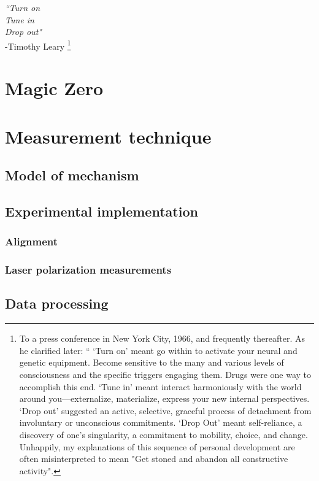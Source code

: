 
\begin{adjustwidth}{3cm}{0cm}
\begin{flushright}
{\emph{``Turn on\\
		Tune in\\
		Drop out"\\} 
-Timothy Leary \footnote{To a press conference in New York City, 1966, and frequently thereafter. As he clarified later: `` `Turn on' meant go within to activate your neural and genetic equipment. Become sensitive to the many and various levels of consciousness and the specific triggers engaging them. Drugs were one way to accomplish this end. `Tune in' meant interact harmoniously with the world around you—externalize, materialize, express your new internal perspectives. `Drop out' suggested an active, selective, graceful process of detachment from involuntary or unconscious commitments. `Drop Out' meant self-reliance, a discovery of one's singularity, a commitment to mobility, choice, and change. Unhappily, my explanations of this sequence of personal development are often misinterpreted to mean "Get stoned and abandon all constructive activity".}}
\end{flushright}
\end{adjustwidth}

\section{Magic Zero}\label{sec:to-history}
\section{Measurement technique}\label{sec:to-method}
\subsection{Model of mechanism}\label{ssec:to-model}
\subsection{Experimental implementation}\label{ssec:to-expt}
\subsubsection*{Alignment}
\subsubsection*{Laser polarization measurements}
\subsection{Data processing}\label{ssec:to-proc}
